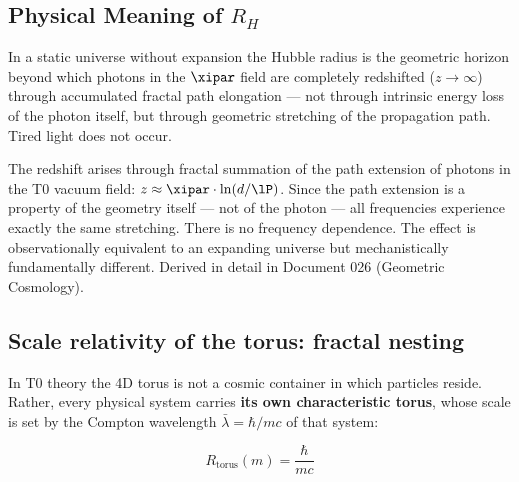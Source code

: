 \subsection{Physical Meaning of \texorpdfstring{$R_H$}{R\_H}}

In a static universe without expansion the Hubble radius is the geometric horizon beyond which photons in the $\xipar$ field are completely redshifted ($z \to \infty$) through accumulated fractal path elongation — not through intrinsic energy loss of the photon itself, but through geometric stretching of the propagation path. Tired light does not occur.

\begin{keypoint}
The redshift arises through fractal summation of the path extension of photons in the T0 vacuum field: $z \approx \xipar \cdot \ln(d/\lP)$. Since the path extension is a property of the geometry itself — not of the photon — all frequencies experience exactly the same stretching. There is no frequency dependence. The effect is observationally equivalent to an expanding universe but mechanistically fundamentally different. Derived in detail in Document 026 (Geometric Cosmology).
\end{keypoint}

\subsection{Scale relativity of the torus: fractal nesting}

In T0 theory the 4D torus is not a cosmic container in which particles reside. Rather, every physical system carries \textbf{its own characteristic torus}, whose scale is set by the Compton wavelength $\bar\lambda = \hbar/mc$ of that system:

\begin{equation}
	R_{\text{torus}}(m) = \frac{\hbar}{mc}
\end{equation}

\begin{table}[h]
\centering
{}
\caption{System-specific torus scales — all sharing $L_0$ as common lower bound}
\end{table}


